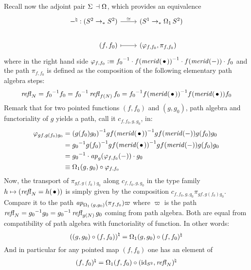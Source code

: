 \documentclass[english,a4]{article}
\begin{document}
Recall now the adjoint pair $\operatorname{\Sigma}{}\dashv\operatorname{\Omega_{}}$, which
provides an equivalence
\begin{equation}
  \label{eq:24}
  \begin{tikzcd}[%
    /tikz/column 1/.append style={anchor=base east},%
    /tikz/column 2/.append style={anchor=base west}]
    \blank^\natural : (\Sp \ptdto \Sp) \rar["\weq"] & (\Sc \ptdto
    \loopspace 1 \Sp)
    \\
    (f,f_0) \rar[mapsto] & (\varphi_{f,f_0}, \pi_{f,f_0})
  \end{tikzcd}
\end{equation}
where in the right hand side
$\varphi_{f,f_0} \defequi\inv{f_0}\cdot \inv{f(\mrd(\base))}\cdot
f(\mrd(\blank))\cdot f_0$ and the path $\pi_{f,f_0}$ is defined as the
composition of the following elementary path algebra steps:
\begin{equation}
  \label{eq:16}
  \refl N = \inv{f_0}f_0 = \inv{f_0}\refl {f(N)} f_0 =  \inv{f_0}\inv{f(\mrd(\base))}f(\mrd(\base)) f_0
\end{equation}
Remark that for two pointed functions $(f,f_0)$ and $(g,g_0)$, path
algebra and functoriality of $g$ yields a path, call it
$c_{f,f_0,g,g_0}$, in:
\begin{equation}
  \begin{aligned}
    \varphi_{gf,g(f_0)g_0} %
    &= \inv{(g(f_0)g_0)}\inv{gf(\mrd(\base))} gf(\mrd(\blank))
    g(f_0)g_0
    \\
    &= \inv{g_0}\inv{g(f_0)}\inv{gf(\mrd(\base))} gf(\mrd(\blank))
    g(f_0)g_0
    \\
    &= \inv{g_0} \cdot \ap g (\varphi_{f,f_0}(\blank)) \cdot g_0
    \\
    &\jdeq \loopspace 1 (g,g_0) \circ \varphi_{f,f_0}
  \end{aligned}\label{eq:26}
\end{equation}
Now, the transport of $\pi_{gf,g(f_0)g_0}$ along $c_{f,f_0,g,g_0}$ in
the type family $h\mapsto (\refl N = h(\base))$ is simply given by the
composition $c_{f,f_0,g,g_0}\pi_{gf,g(f_0)g_0}$. Compare it to the
path $\mathop{{\it ap}_{\operatorname{\Omega_{1}}{(g,g_0)}}}(\pi_{f,f_0})\varpi$ where $\varpi$ is
the path $\mathop{{\mathit{refl}}_{N}} = {g_0}^{-1}g_0 = {g_0}^{-1}\mathop{{\mathit{refl}}_{g(N)}}g_0$ coming
from path algebra. Both are equal from compatibility of path algebra
with functoriality of function. In other words:
\begin{equation}
  \label{eq:27}
  {\left((g,g_0)\circ (f,f_0)\right)}^\natural = \operatorname{\Omega_{1}} (g,g_0) \circ (f,f_0)^\natural 
\end{equation}
And in particular for any pointed map $(f,f_0)$ one has an element of
\begin{displaymath}
  (f,f_0)^\natural = \operatorname{\Omega_{1}} (f,f_0) \circ
  (\mathord{\mathrm{id}}_{S^2},\mathop{{\mathit{refl}}_{N}})^\natural
\end{displaymath}
\end{document}
